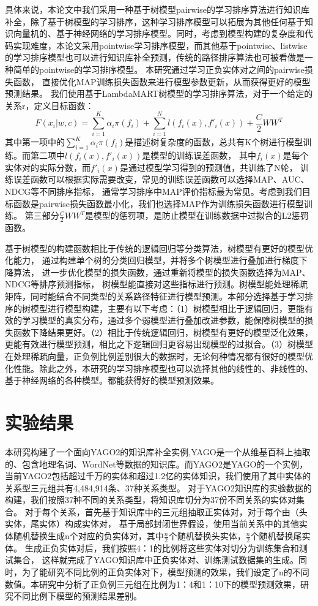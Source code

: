具体来说，本论文中我们采用一种基于树模型pairwise的学习排序算法进行知识库补全，除了基于树模型的学习排序，这种学习排序模型可以拓展为其他任何基于知识向量机的、基于神经网络的学习排序模型。同时，考虑到模型构建的复杂度和代码实现难度，本论文采用pointwise学习排序模型，而其他基于pointwise、listwise的学习排序模型也可以进行知识库补全预测，传统的路径排序算法也可被看做是一种简单的pointwise的学习排序模型。
本研究通过学习正负实体对之间的pairwise损失函数，
直接优化MAP训练损失函数来进行模型参数更新，从而获得更好的模型预测结果。
我们使用基于LambdaMART树模型的学习排序算法，对于一个给定的关系r，定义目标函数：
$$F(x_i|w,c)=\sum_{i=1}^K\alpha_i\pi(f_i)+\sum_{i=1}^Nl(f_i(x),f'_i(x))+\frac{C}{2}WW^T$$
其中第一项中的$\sum_{i=1}^K\alpha_i\pi(f_i)$是描述树复杂度的函数，总共有K个树进行模型训练。而第二项中$l(f_i(x),f'_i(x))$是模型的训练误差函数，
其中$f_i (x)$是每个实体对的实际分数，而$f'_i(x)$是通过模型学习得到的预测值，共训练了N轮，
训练误差函数可以根据实际需要改变，常见的训练误差函数可以选择MAP、AUC、NDCG等不同排序指标，
通常学习排序中MAP评价指标最为常见。考虑到我们目标函数是pairwise损失函数最小化，我们也选择MAP作为训练损失函数进行模型训练。
第三部分$\frac{C}{2}WW^T$是模型的惩罚项，是防止模型在训练数据中过拟合的L2惩罚函数。

基于树模型的构建函数相比于传统的逻辑回归等分类算法，树模型有更好的模型优化能力，
通过构建单个树的分类回归模型，并将多个树模型进行叠加进行梯度下降算法，
进一步优化模型的损失函数，通过重新将模型的损失函数选择为MAP、NDCG等排序预测指标，
树模型能直接对这些指标进行预测。树模型能处理稀疏矩阵，同时能结合不同类型的关系路径特征进行模型预测。本部分选择基于学习排序的树模型进行模型构建，主要有以下考虑：（1）树模型相比于逻辑回归，更能有效的学习模型的真实分布，通过多个弱模型进行叠加改进参数，能保障树模型的损失函数下降结果更好。（2）相比于传统逻辑回归，树模型有更好的模型泛化效果，更能有效进行模型预测，相比之下逻辑回归更容易出现模型的过拟合。（3）树模型在处理稀疏向量，正负例比例差别很大的数据时，无论何种情况都有很好的模型优化性能。除此之外，本研究的学习排序模型也可以选择其他的线性的、非线性的、基于神经网络的各种模型。都能获得好的模型预测效果。

\section{实验结果}
\label{cha:exp-relational}

本研究构建了一个面向YAGO2的知识库补全实例,YAGO是一个从维基百科上抽取的、包含地理名词、WordNet等数据的知识库。而YAGO2是YAGO的一个实例，
当前YAGO2包括超过千万的实体和超过1.2亿的实体知识，我们使用了其中实体的关系型三元组共有4,484,914条、37种关系类型。
对于YAGO2知识库的实验数据的构建，我们按照37种不同的关系类型，将知识库切分为37份不同关系的实体对集合。
对于每个关系，首先基于知识库中的三元组抽取正实体对，对于每个由（头实体，尾实体）构成实体对，
基于局部封闭世界假设，使用当前关系中的其他实体随机替换生成n个对应的负实体对，其中$\frac{n}{2}$个随机替换头实体，$\frac{n}{2}$个随机替换尾实体。
生成正负实体对后，我们按照4：1的比例将这些实体对切分为训练集合和测试集合，
这样就完成了YAGO知识库中正负实体对、训练测试数据集的生成。同时，为了能研究不同比例的正负实体对下，模型预测的效果，我们设定了n的不同数值。本研究中分析了正负例三元组在比例为1：4和1：10下的模型预测效果，研究不同比例下模型的预测结果差别。

